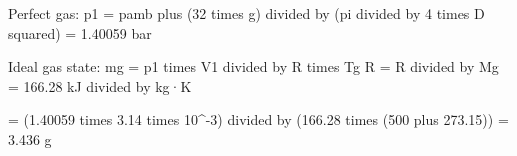 Perfect gas:  
p1 = pamb plus (32 times g) divided by (pi divided by 4 times D squared)  
= 1.40059 bar  

Ideal gas state:  
mg = p1 times V1 divided by R times Tg  
R = R divided by Mg = 166.28 kJ divided by kg·K  

= (1.40059 times 3.14 times 10^-3) divided by (166.28 times (500 plus 273.15))  
= 3.436 g
